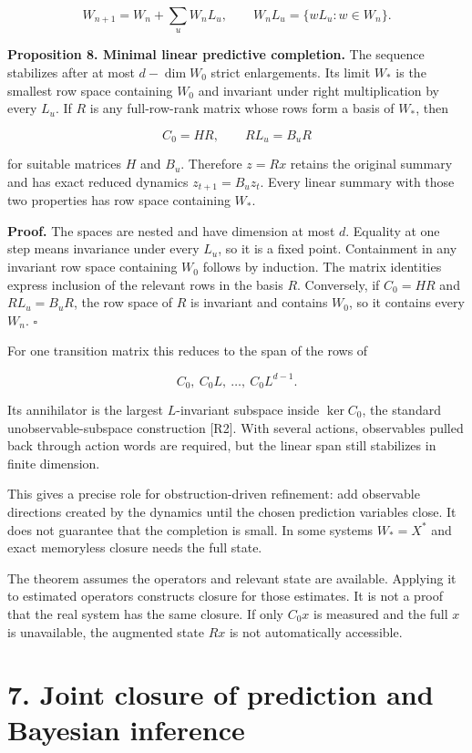 \documentclass[11pt,letterpaper]{article}
\begin{document}
\[
W_{n+1}=W_n+\sum_uW_nL_u,
\qquad W_nL_u=\{wL_u:w\in W_n\}.
\]

\textbf{Proposition 8. Minimal linear predictive completion.} The
sequence stabilizes after at most \(d-\dim W_0\) strict enlargements.
Its limit \(W_*\) is the smallest row space containing \(W_0\) and
invariant under right multiplication by every \(L_u\). If \(R\) is any
full-row-rank matrix whose rows form a basis of \(W_*\), then

\[
C_0=HR,\qquad RL_u=B_uR
\]

for suitable matrices \(H\) and \(B_u\). Therefore \(z=Rx\) retains the
original summary and has exact reduced dynamics \(z_{t+1}=B_uz_t\).
Every linear summary with those two properties has row space containing
\(W_*\).

\textbf{Proof.} The spaces are nested and have dimension at most \(d\).
Equality at one step means invariance under every \(L_u\), so it is a
fixed point. Containment in any invariant row space containing \(W_0\)
follows by induction. The matrix identities express inclusion of the
relevant rows in the basis \(R\). Conversely, if \(C_0=HR\) and
\(RL_u=B_uR\), the row space of \(R\) is invariant and contains \(W_0\),
so it contains every \(W_n\). \(\square\)

For one transition matrix this reduces to the span of the rows of

\[
C_0,\ C_0L,\ \ldots,\ C_0L^{d-1}.
\]

Its annihilator is the largest \(L\)-invariant subspace inside
\(\ker C_0\), the standard unobservable-subspace construction {[}R2{]}.
With several actions, observables pulled back through action words are
required, but the linear span still stabilizes in finite dimension.

This gives a precise role for obstruction-driven refinement: add
observable directions created by the dynamics until the chosen
prediction variables close. It does not guarantee that the completion is
small. In some systems \(W_*=X^*\) and exact memoryless closure needs
the full state.

The theorem assumes the operators and relevant state are available.
Applying it to estimated operators constructs closure for those
estimates. It is not a proof that the real system has the same closure.
If only \(C_0x\) is measured and the full \(x\) is unavailable, the
augmented state \(Rx\) is not automatically accessible.

\section{7. Joint closure of prediction and Bayesian
inference}\label{joint-closure-of-prediction-and-bayesian-inference}
\end{document}
